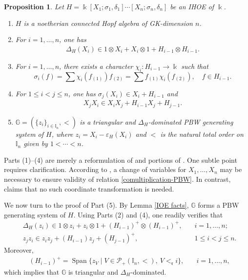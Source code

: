 \documentclass{article}
\makeatletter
\renewenvironment{proof}[1][\proofname]{\par
	\pushQED{\qed}%
	\normalfont \topsep6\p@\@plus6\p@\relax
	\trivlist
	\item[\hskip\labelsep
	\bfseries
	#1\@addpunct{.}]\ignorespaces
}{%
	\popQED\endtrivlist\@endpefalse
}
\theoremstyle{plain}
\newtheorem{prop}[thm]{Proposition}
\theoremstyle{definition}
\numberwithin{equation}{section}
\DeclareMathOperator{\Span}{Span}
\newcommand{\GG}{\mathbb{G}}
\newcommand{\rr}{\mathfrak{r}}
\makeatother
\begin{document}
	\begin{prop}\label{IHOE properties}
		Let $H = \Bbbk[X_{1};\sigma_{1},\delta_{1}]\cdots[X_{n};\sigma_{n},\delta_{n}]$ be an IHOE of $\Bbbk$.
		\begin{enumerate}
			\item $H$ is a noetherian connected Hopf algebra of GK-dimension $n$.
			\item For $i=1,\ldots, n$, one has
			\begin{eqnarray}\label{comultiplication-PBW}
				\Delta_{H}(X_{i}) \in  1\otimes X_{i} + X_{i}\otimes1+ H_{i-1} \otimes H_{i-1}.
			\end{eqnarray}
			\item For $i=1,\dots,n$, there exists a character $\chi_{i}:H_{i-1}\to\Bbbk$ such that
			\[
			\sigma_{i} (f) = \sum \chi_{i}(f_{(1)}) f_{(2)} = \sum f_{(1)} \chi_{i}(f_{(2)}), \quad f \in H_{i-1}.
			\]
			\item For $1\leq i<j\leq n$, one has $\sigma_{j} (X_{i})\in X_{i} +H_{i-1}$ and
			\begin{eqnarray}\label{permutation-PBW}
				X_{j}X_{i} \in  X_{i}X_{j} + H_{i-1} X_{j} + H_{j-1}.
			\end{eqnarray}
			\item $\GG=(\{z_{i}\}_{i\in \mathbb{I}_{n}}, <)$ is a triangular and $\Delta_{H}$-dominated PBW generating system of $H$, where $z_{i} = X_{i} -\varepsilon_{H}(X_{i})$ and $<$ is the natural total order on $\mathbb{I}_{n}$ given by $1<\cdots < n$.
		\end{enumerate}
	\end{prop}
	
	\begin{proof}
		Parts (1)--(4) are merely a reformulation of \cite[Proposition 2.2]{BZ22} and portions of \cite[Theorem 3.2]{BOZZ15}. One subtle point requires clarification. According to \cite[Proposition 2.2]{BZ22}, a change of variables for $X_{1},\dots,X_{n}$ may be necessary to ensure validity of relation \eqref{comultiplication-PBW}. In contrast, \cite[Proposition 2.8]{BOZZ15} claims that no such coordinate transformation is needed.
		
		We now turn to the proof of Part (5). By Lemma \ref{IOE facts}, $\GG$ forms a PBW generating system of $H$. Using Parts (2) and (4), one readily verifies that
		\begin{eqnarray*}
			& \Delta_{H}(z_{i}) \in  1\otimes z_{i} + z_{i}\otimes1+ (H_{i-1})^{+} \otimes (H_{i-1})^{+},    & \quad i=1,\ldots, n; \\
			& z_{j}z_{i} \in  z_{i}z_{j} + (H_{i-1}) z_{j} + (H_{j-1})^{+}, & \quad 1\leq i<j\leq n.
		\end{eqnarray*}
		Moreover,
		\begin{eqnarray*}
			&(H_{i-1})^{+} =\Span\{z_{V}\mid V\in \mathcal{P}_{+}(\mathbb{I}_{n}, <), ~ V<_{\rr} i\}, &  \quad i=1,\ldots, n,
		\end{eqnarray*}
		which implies that $\GG$ is triangular and $\Delta_{H}$-dominated.
	\end{proof}
	
\end{document}
